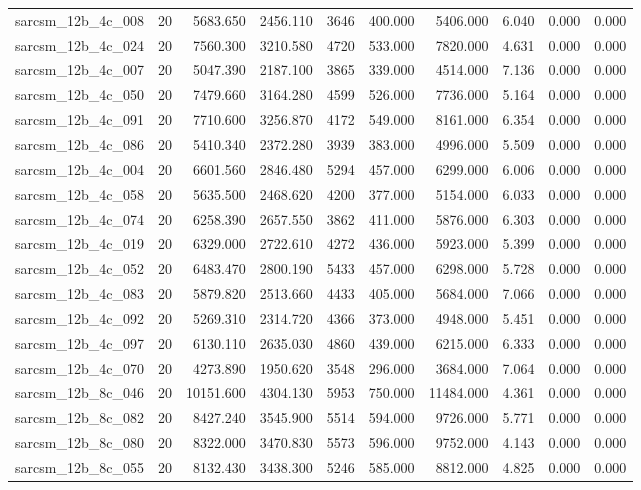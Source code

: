 \begin{tabular}{lrrrrrrrrr}
sarcsm\_12b\_4c\_008 & 20 & 5683.650 & 2456.110 & 3646 & 400.000 & 5406.000 & 6.040 & 0.000 & 0.000 \\
sarcsm\_12b\_4c\_024 & 20 & 7560.300 & 3210.580 & 4720 & 533.000 & 7820.000 & 4.631 & 0.000 & 0.000 \\
sarcsm\_12b\_4c\_007 & 20 & 5047.390 & 2187.100 & 3865 & 339.000 & 4514.000 & 7.136 & 0.000 & 0.000 \\
sarcsm\_12b\_4c\_050 & 20 & 7479.660 & 3164.280 & 4599 & 526.000 & 7736.000 & 5.164 & 0.000 & 0.000 \\
sarcsm\_12b\_4c\_091 & 20 & 7710.600 & 3256.870 & 4172 & 549.000 & 8161.000 & 6.354 & 0.000 & 0.000 \\
sarcsm\_12b\_4c\_086 & 20 & 5410.340 & 2372.280 & 3939 & 383.000 & 4996.000 & 5.509 & 0.000 & 0.000 \\
sarcsm\_12b\_4c\_004 & 20 & 6601.560 & 2846.480 & 5294 & 457.000 & 6299.000 & 6.006 & 0.000 & 0.000 \\
sarcsm\_12b\_4c\_058 & 20 & 5635.500 & 2468.620 & 4200 & 377.000 & 5154.000 & 6.033 & 0.000 & 0.000 \\
sarcsm\_12b\_4c\_074 & 20 & 6258.390 & 2657.550 & 3862 & 411.000 & 5876.000 & 6.303 & 0.000 & 0.000 \\
sarcsm\_12b\_4c\_019 & 20 & 6329.000 & 2722.610 & 4272 & 436.000 & 5923.000 & 5.399 & 0.000 & 0.000 \\
sarcsm\_12b\_4c\_052 & 20 & 6483.470 & 2800.190 & 5433 & 457.000 & 6298.000 & 5.728 & 0.000 & 0.000 \\
sarcsm\_12b\_4c\_083 & 20 & 5879.820 & 2513.660 & 4433 & 405.000 & 5684.000 & 7.066 & 0.000 & 0.000 \\
sarcsm\_12b\_4c\_092 & 20 & 5269.310 & 2314.720 & 4366 & 373.000 & 4948.000 & 5.451 & 0.000 & 0.000 \\
sarcsm\_12b\_4c\_097 & 20 & 6130.110 & 2635.030 & 4860 & 439.000 & 6215.000 & 6.333 & 0.000 & 0.000 \\
sarcsm\_12b\_4c\_070 & 20 & 4273.890 & 1950.620 & 3548 & 296.000 & 3684.000 & 7.064 & 0.000 & 0.000 \\
sarcsm\_12b\_8c\_046 & 20 & 10151.600 & 4304.130 & 5953 & 750.000 & 11484.000 & 4.361 & 0.000 & 0.000 \\
sarcsm\_12b\_8c\_082 & 20 & 8427.240 & 3545.900 & 5514 & 594.000 & 9726.000 & 5.771 & 0.000 & 0.000 \\
sarcsm\_12b\_8c\_080 & 20 & 8322.000 & 3470.830 & 5573 & 596.000 & 9752.000 & 4.143 & 0.000 & 0.000 \\
sarcsm\_12b\_8c\_055 & 20 & 8132.430 & 3438.300 & 5246 & 585.000 & 8812.000 & 4.825 & 0.000 & 0.000 \\

\end{tabular}
